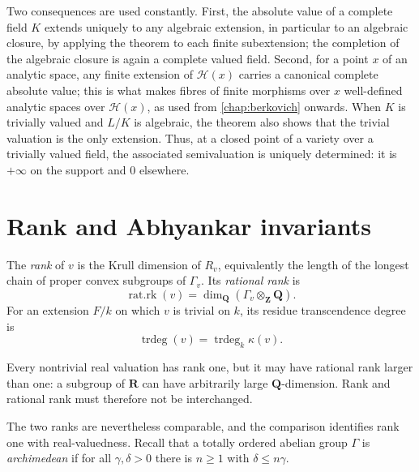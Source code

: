 \begin{remark}\label{rem:complete-field-valuation-extensions}
Two consequences are used constantly. First, the absolute value of a
complete field $K$ extends uniquely to any algebraic extension, in
particular to an algebraic closure, by applying the theorem to each
finite subextension; the completion of the algebraic closure is again a
complete valued field. Second, for a point $x$ of an analytic space, any
finite extension of $\mathcal H(x)$ carries a canonical complete absolute
value; this is what makes fibres of finite morphisms over $x$
well-defined analytic spaces over $\mathcal H(x)$, as used from
\cref{chap:berkovich} onwards. When $K$ is trivially valued and $L/K$ is
algebraic, the theorem also shows that the trivial valuation is the only
extension. Thus, at a closed point of a variety over a trivially valued
field, the associated semivaluation is uniquely determined: it is
$+\infty$ on the support and $0$ elsewhere.
\end{remark}

\section{Rank and Abhyankar invariants}

\begin{definition}\label{def:valuation-rank-invariants}
The \emph{rank} of $v$ is the Krull dimension of $R_v$, equivalently the
length of the longest chain of proper convex subgroups of $\Gamma_v$. Its
\emph{rational rank} is
\[
                    \operatorname{rat.rk}(v)
       =\dim_{\mathbf Q}(\Gamma_v\otimes_{\mathbf Z}\mathbf Q).
\]
For an extension $F/k$ on which $v$ is trivial on $k$, its residue
transcendence degree is
\[
                    \operatorname{trdeg}(v)
       =\operatorname{trdeg}_k\kappa(v).
\]
\end{definition}

Every nontrivial real valuation has rank one, but it may have rational rank
larger than one: a subgroup of $\mathbf R$ can have arbitrarily large
$\mathbf Q$-dimension. Rank and rational rank must therefore not be
interchanged.

The two ranks are nevertheless comparable, and the comparison identifies
rank one with real-valuedness. Recall that a totally ordered abelian group
$\Gamma$ is \emph{archimedean} if for all $\gamma,\delta>0$ there is
$n\geq1$ with $\delta\leq n\gamma$.

